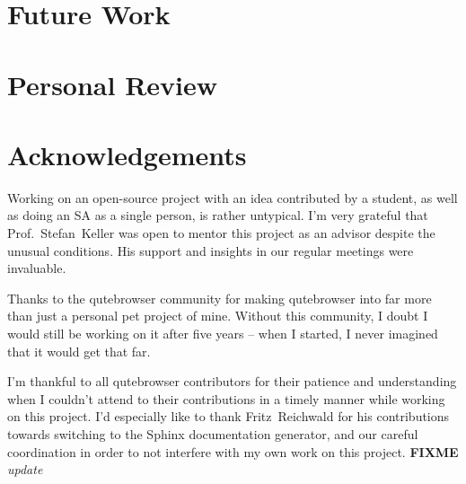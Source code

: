 \documentclass[a4paper,parskip=full,DIV=14,BCOR=15mm]{scrreprt}
\newcommand{\fixme}[1]{\textbf{FIXME} \emph{#1}}
\begin{document}
\section{Future Work}

% 
% 
% 



\section{Personal Review}

\section{Acknowledgements}
Working on an open-source project with an idea contributed by a student, as well
as doing an SA as a single person, is rather untypical. I'm very grateful that
Prof.~Stefan~Keller was open to mentor this project as an advisor despite the
unusual conditions. His support and insights in our regular meetings were
invaluable.

Thanks to the qutebrowser community for making qutebrowser into far more than
just a personal pet project of mine. Without this community, I doubt I would
still be working on it after five years -- when I started, I never imagined that
it would get that far.

I'm thankful to all qutebrowser contributors for their patience and
understanding when I couldn't attend to their contributions in a timely manner
while working on this project. I'd especially like to thank Fritz~Reichwald for
his contributions towards switching to the Sphinx documentation generator, and
our careful coordination in order to not interfere with my own work on this
project. \fixme{update}
\end{document}
